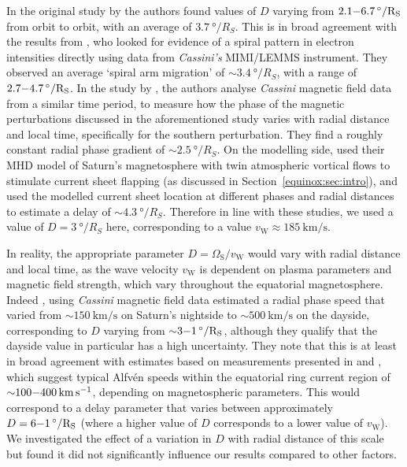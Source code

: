 In the original study by \citet{arridge2011} the authors found values of $D$ varying from $2.1{\--}\SI{6.7}{\degree/R_S}$ from orbit to orbit, with an average of $\SI{3.7}{\degree/R_S}$. This is in broad agreement with the results from \citet{carbary2007}, who looked for evidence of a spiral pattern in electron intensities directly using data from \textit{Cassini's} MIMI/LEMMS instrument. They observed an average `spiral arm migration' of ${{\sim}}\SI{3.4}{\degree/R_S}$, with a range of $2.7{\--}\SI{4.7}{\degree/R_S}$. In the study by \citet{provan2012}, the authors analyse \textit{Cassini} magnetic field data from a similar time period, to measure how the phase of the magnetic perturbations discussed in the aforementioned \citet{andrews2012} study varies with radial distance and local time, specifically for the southern perturbation. They find a roughly constant radial phase gradient of ${{\sim}}\SI{2.5}{\degree/R_S}$. On the modelling side, \citet{jiaandkivelson2012} used their MHD model of Saturn's magnetosphere with twin atmospheric vortical flows to stimulate current sheet flapping (as discussed in Section~\ref{equinox:sec:intro}), and used the modelled current sheet location at different phases and radial distances to estimate a delay of ${\sim}\SI{4.3}{\degree/R_S}$. Therefore in line with these studies, we used a value of $D = \SI{3}{\degree/R_S}$ here, corresponding to a value $v_\mathrm{W} \approx \SI{185}{\km\per\second}$.

In reality, the appropriate parameter $D = \Omega_\mathrm{S}/v_\mathrm{W}$ would vary with radial distance and local time, as the wave velocity $v_\mathrm{W}$ is dependent on plasma parameters and magnetic field strength, which vary throughout the equatorial magnetosphere. Indeed \citet{andrews2010}, using \textit{Cassini} magnetic field data estimated a radial phase speed that varied from ${\sim}\SI{150}{\km\per\second}$ on Saturn's nightside to ${\sim}\SI{500}{\km\per\second}$ on the dayside, corresponding to $D$ varying from ${\sim}3{\--}\SI{1}{\degree/R_S}$, although they qualify that the dayside value in particular has a high uncertainty. They note that this is at least in broad agreement with estimates based on measurements presented in \citet{wilson2008} and \citet{mcandrews2009}, which suggest typical Alfv\'{e}n speeds within the equatorial ring current region of ${\sim}100{\--}\SI{400}{\km\per\second}$, depending on magnetospheric parameters. This would correspond to a delay parameter that varies between approximately $D = 6{\--}\SI{1}{\degree/R_S}$ (where a higher value of $D$ corresponds to a lower value of $v_\mathrm{W}$). We investigated the effect of a variation in $D$ with radial distance of this scale but found it did not significantly influence our results compared to other factors. %

